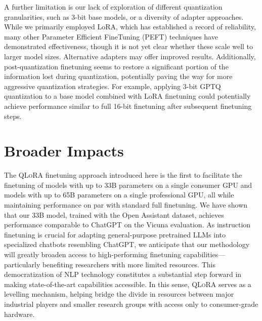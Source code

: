 A further limitation is our lack of exploration of different quantization granularities, such as 3-bit base models, or a diversity of adapter approaches. While we primarily employed LoRA, which has established a record of reliability, many other Parameter Efficient FineTuning (PEFT) techniques have demonstrated effectiveness, though it is not yet clear whether these scale well to larger model sizes. Alternative adapters may offer improved results. Additionally, post-quantization finetuning seems to restore a significant portion of the information lost during quantization, potentially paving the way for more aggressive quantization strategies. For example, applying 3-bit GPTQ quantization to a base model combined with LoRA finetuning could potentially achieve performance similar to full 16-bit finetuning after subsequent finetuning steps.

\section{Broader Impacts}

The \textsc{QLoRA} finetuning approach introduced here is the first to facilitate the finetuning of models with up to 33B parameters on a single consumer GPU and models with up to 65B parameters on a single professional GPU, all while maintaining performance on par with standard full finetuning. We have shown that our 33B model, trained with the Open Assistant dataset, achieves performance comparable to ChatGPT on the Vicuna evaluation. As instruction finetuning is crucial for adapting general-purpose pretrained LLMs into specialized chatbots resembling ChatGPT, we anticipate that our methodology will greatly broaden access to high-performing finetuning capabilities—particularly benefiting researchers with more limited resources. This democratization of NLP technology constitutes a substantial step forward in making state-of-the-art capabilities accessible. In this sense, \textsc{QLoRA} serves as a levelling mechanism, helping bridge the divide in resources between major industrial players and smaller research groups with access only to consumer-grade hardware.

